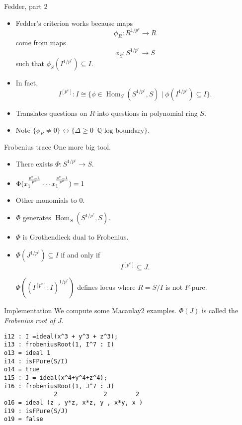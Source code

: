 \documentclass[xcolor=dvipsnames]{beamer}
\newcommand{\memph}[1]{{\color{Red}\emph{#1}}}
\DeclareMathOperator{\Hom}{Hom}
\theoremstyle{remark}
\begin{document}
\begin{frame}[t]{Fedder, part 2}
  \begin{itemize}
  \item<1->Fedder's criterion works because maps
  \[
  \phi_R : R^{1/p^e} \to R
  \]
  come from maps
  \[
  \phi_S : S^{1/p^e} \to S
  \]
  such that $\phi_S(I^{1/p^e}) \subseteq I$.
\item<2->  In fact,
\[
I^{[p^e]} : I \cong \{ \phi \in \Hom_S(S^{1/p^e}, S) \;|\; \phi(I^{1/p^e}) \subseteq I \}.
\]
\item<3->  Translates questions on $R$ into questions in polynomial ring $S$.
\item<4->  Note $\{\phi_R \neq 0\} \leftrightarrow \{\Delta\geq 0\;\; \text{$\mathbb{Q}$-log boundary} \}$.
\end{itemize}
\end{frame}

\begin{frame}[t]{Frobenius trace}
  One more big tool.
  \begin{itemize}
    \item<2->  There exists $\Phi : S^{1/p^e} \to S$.
    \item<3->  $\Phi(x_1^{p^e - 1 \over p^e} \cdots x_1^{p^e - 1 \over p^e}) = 1$
    \item<4->  Other monomials to 0.
    \item<5->  $\Phi$ generates $\Hom_S(S^{1/p^e}, S)$.
    \item<6->  $\Phi$ is Grothendieck dual to Frobenius.
    \item<7->  $\Phi(J^{1/p^e}) \subseteq I$ if and only if
    \[
      I^{[p^e]} \subseteq J.
    \]
    \begin{theorem}
      $\Phi((I^{[p^e]} : I)^{1/p^e})$ defines locus where $R = S/I$ is not $F$-pure.
    \end{theorem}
  \end{itemize}
\end{frame}

\begin{frame}[fragile]{Implementation}
  We compute some Macaulay2 examples.  $\Phi(J)$ is called the \memph{Frobenius root of $J$}.
  \begin{verbatim}
i12 : I =ideal(x^3 + y^3 + z^3);
i13 : frobeniusRoot(1, I^7 : I)
o13 = ideal 1
i14 : isFPure(S/I)
o14 = true
i15 : J = ideal(x^4+y^4+z^4);
i16 : frobeniusRoot(1, J^7 : J)
              2             2        2
o16 = ideal (z , y*z, x*z, y , x*y, x )
i19 : isFPure(S/J)
o19 = false
  \end{verbatim}
\end{frame}
\end{document}
